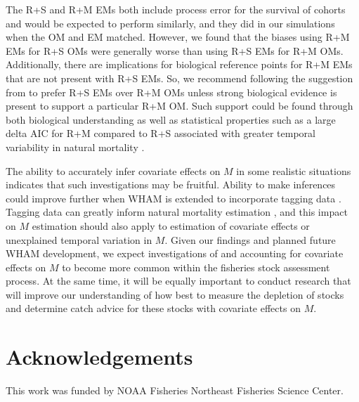 \documentclass[
  12pt,
]{article}
\newlength{\cslhangindent}
\newlength{\cslentryspacingunit} %
\newenvironment{CSLReferences}[2] %
 {%
  \setlength{\parindent}{0pt}
  \ifodd #1
  \let\oldpar\par
  \def\par{\hangindent=\cslhangindent\oldpar}
  \fi
  \setlength{\parskip}{#2\cslentryspacingunit}
 }%
 {}
\begin{document}
The R+S and R+M EMs both include process error for the survival of cohorts and would be expected to perform similarly, and they did in our simulations when the OM and EM matched. However, we found that the biases using R+M EMs for R+S OMs were generally worse than using R+S EMs for R+M OMs. Additionally, there are implications for biological reference points for R+M EMs \citep[e.g.,][]{legaultpalmer16} that are not present with R+S EMs. So, we recommend following the suggestion from \citet{lietal24} to prefer R+S EMs over R+M OMs unless strong biological evidence is present to support a particular R+M OM. Such support could be found through both biological understanding \citep[e.g.,][]{trijouletetal20} as well as statistical properties such as a large delta AIC for R+M compared to R+S associated with greater temporal variability in natural mortality \citep{milleretal_inreview1}.

The ability to accurately infer covariate effects on \(M\) in some realistic situations indicates that such investigations may be fruitful. Ability to make inferences could improve further when WHAM is extended to incorporate tagging data \citep{milleretal_inreview}. Tagging data can greatly inform natural mortality estimation \citep{pollocketal91, hampton00}, and this impact on \(M\) estimation should also apply to estimation of covariate effects or unexplained temporal variation in \(M\). Given our findings and planned future WHAM development, we expect investigations of and accounting for covariate effects on \(M\) to become more common within the fisheries stock assessment process. At the same time, it will be equally important to conduct research that will improve our understanding of how best to measure the depletion of stocks and determine catch advice for these stocks with covariate effects on \(M\).

\hypertarget{acknowledgements}{%
\section*{Acknowledgements}\label{acknowledgements}}

This work was funded by NOAA Fisheries Northeast Fisheries Science Center.

\pagebreak



\hypertarget{refs}{}
\begin{CSLReferences}{0}{0}
\end{CSLReferences}
\end{document}
